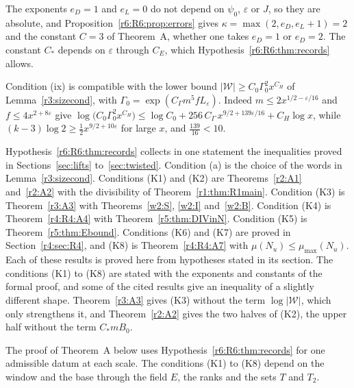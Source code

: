 The exponents $e_D=1$ and $e_L=0$ do not depend on $\psi_0$, $\varepsilon$ or $J$, so they are absolute, and Proposition~\ref{r6:R6:prop:errors} gives $\kappa=\max(2,e_D,e_L+1)=2$ and the constant $C=3$ of Theorem~A, whether one takes $e_D=1$ or $e_D=2$. The constant $C_\ast$ depends on $\varepsilon$ through $C_E$, which Hypothesis~\ref{r6:R6:thm:records} allows.

Condition (ix) is compatible with the lower bound $\lvert\mathcal W\rvert\ge C_0\Gamma_0^2x^{C_H}$ of Lemma~\ref{r3:sizecond}, with $\Gamma_0=\exp(C_\Gamma m^5fL_\varepsilon)$. Indeed $m\le2x^{1/2-\varepsilon/16}$ and $f\le4x^{2+8\varepsilon}$ give $\log\big(C_0\Gamma_0^2x^{C_H}\big)\le\log C_0+256\,C_\Gamma\,x^{9/2+139\varepsilon/16}+C_H\log x$, while $(k-3)\log2\ge\frac12x^{9/2+10\varepsilon}$ for large $x$, and $\frac{139}{16}<10$.



Hypothesis~\ref{r6:R6:thm:records} collects in one statement the inequalities proved in Sections~\ref{sec:lifts} to~\ref{sec:twisted}. Condition (a) is the choice of the words in Lemma~\ref{r3:sizecond}. Conditions (K1) and (K2) are Theorems~\ref{r2:A1} and~\ref{r2:A2} with the divisibility of Theorem~\ref{r1:thm:R1main}. Condition (K3) is Theorem~\ref{r3:A3} with Theorems~\ref{w2:S}, \ref{w2:I} and~\ref{w2:B}. Condition (K4) is Theorem~\ref{r4:R4:A4} with Theorem~\ref{r5:thm:DIVinN}. Condition (K5) is Theorem~\ref{r5:thm:Ebound}. Conditions (K6) and (K7) are proved in Section~\ref{r4:sec:R4}, and (K8) is Theorem~\ref{r4:R4:A7} with $\mu(N_u)\le\mu_{\max}(N_u)$. Each of these results is proved here from hypotheses stated in its section. The conditions (K1) to (K8) are stated with the exponents and constants of the formal proof, and some of the cited results give an inequality of a slightly different shape. Theorem~\ref{r3:A3} gives (K3) without the term $\log\lvert\mathcal W\rvert$, which only strengthens it, and Theorem~\ref{r2:A2} gives the two halves of (K2), the upper half without the term $C_\ast mB_0$. 

The proof of Theorem~A below uses Hypothesis~\ref{r6:R6:thm:records} for one admissible datum at each scale. The conditions (K1) to (K8) depend on the window and the base through the field $E$, the ranks and the sets $T$ and $T_2$.

